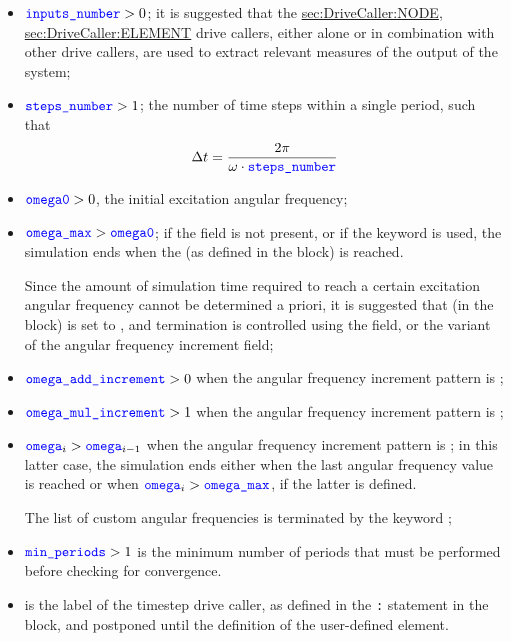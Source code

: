 \begin{itemize}
\item $\textcolor{blue}{\texttt{inputs\_number}} > 0$; it is suggested that the
\hyperref{\kw{node}}{\kw{node} (see Section~}{)}{sec:DriveCaller:NODE},
\hyperref{\kw{element}}{\kw{element} (see Section~}{)}{sec:DriveCaller:ELEMENT}
drive callers, either alone or in combination with other drive callers, are used to extract relevant measures of the output of the system;

\item $\textcolor{blue}{\texttt{steps\_number}} > 1$; the number of time steps within a single period, such that
\begin{align*}
	\Delta t = \frac{2 \pi}{\omega \cdot \textcolor{blue}{\texttt{steps\_number}}}
\end{align*}

\item $\textcolor{blue}{\texttt{omega0}} > 0$, the initial excitation angular frequency;

\item $\textcolor{blue}{\texttt{omega\_max}} > \textcolor{blue}{\texttt{omega0}}$; if the  field is not present, or if the keyword  is used, the simulation ends when the  (as defined in the  block) is reached.

Since the amount of simulation time required to reach a certain excitation angular frequency cannot be determined a priori, it is suggested that  (in the  block) is set to , and termination is controlled using the  field, or the  variant of the angular frequency increment field;

\item $\textcolor{blue}{\texttt{omega\_add\_increment}} > 0$ when the angular frequency increment pattern is ;

\item $\textcolor{blue}{\texttt{omega\_mul\_increment}} > 1$ when the angular frequency increment pattern is ;

\item $\textcolor{blue}{\texttt{omega}}_i > \textcolor{blue}{\texttt{omega}}_{i-1}$ when the angular frequency increment pattern is ; in this latter case, the simulation ends either when the last angular frequency value is reached or when $\textcolor{blue}{\texttt{omega}}_i > \textcolor{blue}{\texttt{omega\_max}}$, if the latter is defined.

The list of custom angular frequencies is terminated by the keyword ;

\item $\textcolor{blue}{\texttt{min\_periods}} > 1$ is the minimum number of periods that must be performed before checking for convergence.

\item {} is the label of the timestep drive caller, as defined in the \texttt{:}  statement in the  block, and postponed until the definition of the user-defined element.
\end{itemize}

